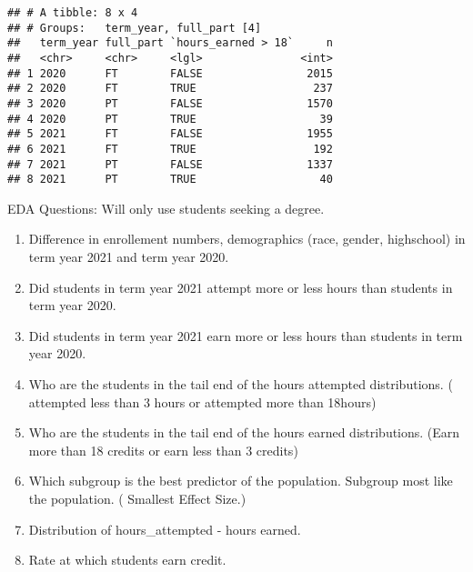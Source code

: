 \documentclass[]{article}
\providecommand{\tightlist}{%
  \setlength{\itemsep}{0pt}\setlength{\parskip}{0pt}}
\begin{document}
\begin{verbatim}
## # A tibble: 8 x 4
## # Groups:   term_year, full_part [4]
##   term_year full_part `hours_earned > 18`     n
##   <chr>     <chr>     <lgl>               <int>
## 1 2020      FT        FALSE                2015
## 2 2020      FT        TRUE                  237
## 3 2020      PT        FALSE                1570
## 4 2020      PT        TRUE                   39
## 5 2021      FT        FALSE                1955
## 6 2021      FT        TRUE                  192
## 7 2021      PT        FALSE                1337
## 8 2021      PT        TRUE                   40
\end{verbatim}

EDA Questions: Will only use students seeking a degree.

\begin{enumerate}
\def\labelenumi{\arabic{enumi}.}
\tightlist
\item
  Difference in enrollement numbers, demographics (race, gender,
  highschool) in term year 2021 and term year 2020.
\item
  Did students in term year 2021 attempt more or less hours than
  students in term year 2020.
\item
  Did students in term year 2021 earn more or less hours than students
  in term year 2020.
\item
  Who are the students in the tail end of the hours attempted
  distributions. ( attempted less than 3 hours or attempted more than
  18hours)
\item
  Who are the students in the tail end of the hours earned
  distributions. (Earn more than 18 credits or earn less than 3 credits)
\item
  Which subgroup is the best predictor of the population. Subgroup most
  like the population. ( Smallest Effect Size.)
\item
  Distribution of hours\_attempted - hours earned.
\item
  Rate at which students earn credit.
\end{enumerate}
\end{document}
